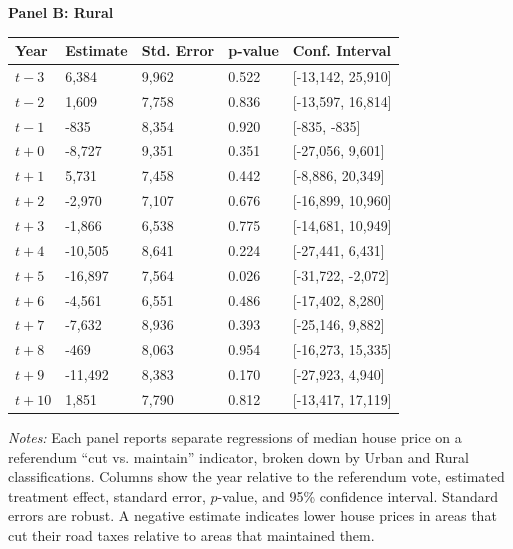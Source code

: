 \begin{table}[htbp]
\begin{threeparttable}
    \centering
    \textbf{Panel B: Rural} \\[4pt]
    \begin{tabularx}{\textwidth}{l*{4}{X}}
    \hline\hline
    \textbf{Year} & \textbf{Estimate} & \textbf{Std. Error} & \textbf{p-value} & \textbf{Conf. Interval} \\
    \hline
    $t - 3$  & 6,384  & 9,962  & 0.522 & [-13,142, 25,910] \\
    $t - 2$  & 1,609  & 7,758  & 0.836 & [-13,597, 16,814] \\
    $t - 1$  & -835   & 8,354  & 0.920 & [-835, -835] \\
    $t + 0$  & -8,727 & 9,351  & 0.351 & [-27,056, 9,601] \\
    $t + 1$  & 5,731  & 7,458  & 0.442 & [-8,886, 20,349] \\
    $t + 2$  & -2,970 & 7,107  & 0.676 & [-16,899, 10,960] \\
    $t + 3$  & -1,866 & 6,538  & 0.775 & [-14,681, 10,949] \\
    $t + 4$  & -10,505 & 8,641 & 0.224 & [-27,441, 6,431] \\
    $t + 5$  & -16,897 & 7,564 & 0.026 & [-31,722, -2,072] \\
    $t + 6$  & -4,561 & 6,551  & 0.486 & [-17,402, 8,280] \\
    $t + 7$  & -7,632 & 8,936  & 0.393 & [-25,146, 9,882] \\
    $t + 8$  & -469   & 8,063  & 0.954 & [-16,273, 15,335] \\
    $t + 9$  & -11,492 & 8,383 & 0.170 & [-27,923, 4,940] \\
    $t + 10$ & 1,851  & 7,790  & 0.812 & [-13,417, 17,119] \\
    \hline
    \end{tabularx}
    
    \begin{tablenotes}
    \small
    \item \textit{Notes:} Each panel reports separate regressions of median house price on a referendum “cut vs. maintain” indicator, broken down by Urban and Rural classifications. Columns show the year relative to the referendum vote, estimated treatment effect, standard error, \(p\)-value, and 95\% confidence interval. Standard errors are robust. A negative estimate indicates lower house prices in areas that cut their road taxes relative to areas that maintained them.
    \end{tablenotes}
    \end{threeparttable}
\end{table}
    


